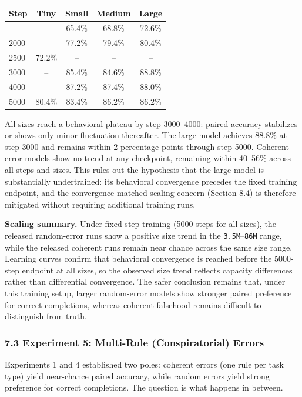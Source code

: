 \documentclass[
  11pt,
]{article}
\newcounter{none} %
\begin{document}
{\def\LTcaptype{none} %
\begin{longtable}[]{@{}lcccc@{}}
\toprule\noalign{}
Step & Tiny & Small & Medium & Large \\
\midrule\noalign{}
\endhead
\bottomrule\noalign{}
\endlastfoot
1000 & -- & 65.4\% & 68.8\% & 72.6\% \\
2000 & -- & 77.2\% & 79.4\% & 80.4\% \\
2500 & 72.2\% & -- & -- & -- \\
3000 & -- & 85.4\% & 84.6\% & 88.8\% \\
4000 & -- & 87.2\% & 87.4\% & 88.0\% \\
5000 & 80.4\% & 83.4\% & 86.2\% & 86.2\% \\
\end{longtable}
}

All sizes reach a behavioral plateau by step 3000--4000: paired accuracy
stabilizes or shows only minor fluctuation thereafter. The large model
achieves 88.8\% at step 3000 and remains within 2 percentage points
through step 5000. Coherent-error models show no trend at any
checkpoint, remaining within 40--56\% across all steps and sizes. This
rules out the hypothesis that the large model is substantially
undertrained: its behavioral convergence precedes the fixed training
endpoint, and the convergence-matched scaling concern (Section 8.4) is
therefore mitigated without requiring additional training runs.

\textbf{Scaling summary.} Under fixed-step training (5000 steps for all
sizes), the released random-error runs show a positive size trend in the
\texttt{3.5M}--\texttt{86M} range, while the released coherent runs
remain near chance across the same size range. Learning curves confirm
that behavioral convergence is reached before the 5000-step endpoint at
all sizes, so the observed size trend reflects capacity differences
rather than differential convergence. The safer conclusion remains that,
under this training setup, larger random-error models show stronger
paired preference for correct completions, whereas coherent falsehood
remains difficult to distinguish from truth.

\subsubsection{7.3 Experiment 5: Multi-Rule (Conspiratorial)
Errors}\label{experiment-5-multi-rule-conspiratorial-errors}

Experiments 1 and 4 established two poles: coherent errors (one rule per
task type) yield near-chance paired accuracy, while random errors yield
strong preference for correct completions. The question is what happens
in between.
\end{document}
